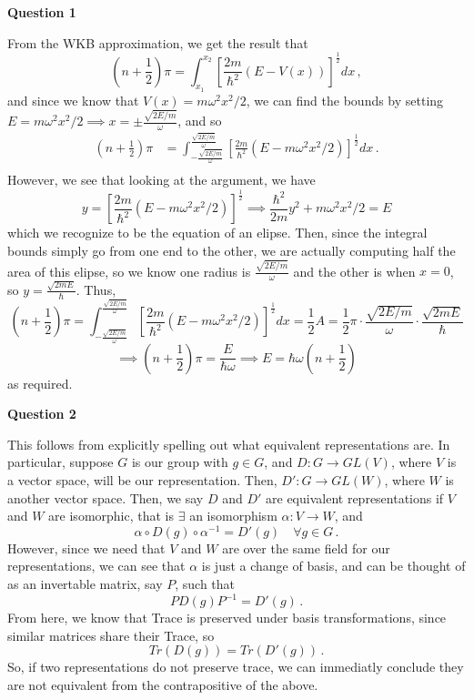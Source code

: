 \documentclass[10pt]{article}
\begin{document}
\textbf{Question 1}

From the WKB approximation, we get the result that
\[  \left(n + \frac{1}{2}\right)\pi = \int_{x_{1}}^{x_{2}}\left[\frac{2m}{\hbar^{2}}(E - V(x))\right]^{\frac{1}{2}}dx\, ,\]
and since we know that $V(x) = m\omega^{2}x^{2}/2$, we can find the bounds by setting $E = m\omega^{2}x^{2}/2 \implies x = \pm \frac{\sqrt{2E/m}}{\omega}$, and so
\begin{equation*}
  \begin{split}
    \left(n + \frac{1}{2}\right)\pi & = \int_{-\frac{\sqrt{2E/m}}{\omega}}^{\frac{\sqrt{2E/m}}{\omega}}\left[\frac{2m}{\hbar^{2}}\left(E -m\omega^{2}x^{2}/2\right)\right]^{\frac{1}{2}}dx\, .\\
  \end{split}
\end{equation*}
However, we see that looking at the argument, we have
\[ y = \left[\frac{2m}{\hbar^{2}}\left(E -m\omega^{2}x^{2}/2\right)\right]^{\frac{1}{2}} \implies \frac{\hbar^{2}}{2m}y^{2} + m\omega^{2}x^{2}/2 = E \]
which we recognize to be the equation of an elipse. Then, since the integral bounds simply go from one end to the other, we are actually computing half the area of this elipse, so we know one radius is $\frac{\sqrt{2E/m}}{\omega}$ and the other is when $x=0$, so $y = \frac{\sqrt{2mE}}{\hbar}$. Thus,
\[ \left(n + \frac{1}{2}\right)\pi = \int_{-\frac{\sqrt{2E/m}}{\omega}}^{\frac{\sqrt{2E/m}}{\omega}}\left[\frac{2m}{\hbar^{2}}\left(E -m\omega^{2}x^{2}/2\right)\right]^{\frac{1}{2}}dx = \frac{1}{2}A = \frac{1}{2}\pi\cdot\frac{\sqrt{2E/m}}{\omega}\cdot \frac{\sqrt{2mE}}{\hbar} \]
\[ \implies \left(n + \frac{1}{2}\right)\pi = \frac{E}{\hbar \omega} \implies E = \hbar\omega\left(n + \frac{1}{2}\right) \]
as required.

\textbf{Question 2}

This follows from explicitly spelling out what equivalent representations are. In particular, suppose $G$ is our group with $g\in G$, and $D: G \to GL(V)$, where $V$ is a vector space, will be our representation. Then, $D': G \to GL(W)$, where $W$ is another vector space. Then, we say $D$ and $D'$ are equivalent representations if $V$ and $W$ are isomorphic, that is $\exists$ an isomorphism $\alpha: V \to W$, and
\[ \alpha \circ D(g) \circ \alpha^{-1} = D'(g) \quad \forall g \in G \, .\]
However, since we need that $V$ and $W$ are over the same field for our representations, we can see that $\alpha$ is just a change of basis, and can be thought of as an invertable matrix, say $P$, such that
\[ PD(g)P^{-1} = D'(g) \, .\]
From here, we know that Trace is preserved under basis transformations, since similar matrices share their Trace, so
\[ Tr(D(g)) = Tr(D'(g))\, .\]
So, if two representations do not preserve trace, we can immediatly conclude they are not equivalent from the contrapositive of the above.
\end{document}
